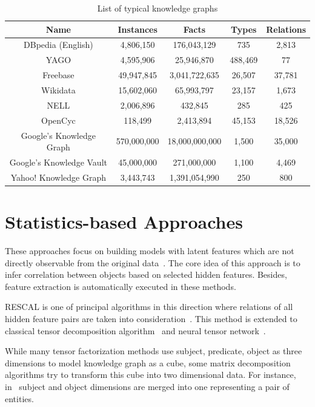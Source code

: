 \begin{table}
\begin{center}
\begin{tabular}{|c|c|c|c|c|}
\hline
Name & Instances & Facts & Types & Relations\\
\hline\hline
DBpedia (English) & 4,806,150 & 176,043,129 & 735 & 2,813\\
\hline
YAGO & 4,595,906 & 25,946,870 & 488,469 & 77\\
\hline
Freebase & 49,947,845 & 3,041,722,635 & 26,507 & 37,781\\
\hline
Wikidata & 15,602,060 & 65,993,797 & 23,157 & 1,673\\
\hline
NELL & 2,006,896 & 432,845 & 285 & 425\\
\hline
OpenCyc & 118,499 & 2,413,894 & 45,153 & 18,526\\
\hline
Google's Knowledge Graph & 570,000,000 & 18,000,000,000 & 1,500 & 35,000\\
\hline
Google's Knowledge Vault & 45,000,000 & 271,000,000 & 1,100 & 4,469\\
\hline
Yahoo! Knowledge Graph & 3,443,743 & 1,391,054,990 & 250 & 800\\
\hline
\end{tabular}
\end{center}
\caption{List of typical knowledge graphs}
\label{table1}
\end{table}

\section{Statistics-based Approaches}

These approaches focus on building models with latent features which are not directly observable from the original data~\cite{ref1}. The core idea of this approach is to infer correlation between objects based on selected hidden features. Besides, feature extraction is automatically executed in these methods.

RESCAL is one of principal algorithms in this direction where relations of all hidden feature pairs are taken into consideration~\cite{ref2, ref3}. This method is extended to classical tensor decomposition algorithm~\cite{ref4} and neural tensor network~\cite{ref5}.

While many tensor factorization methods use subject, predicate, object as three dimensions to model knowledge graph as a cube, some matrix decomposition algorithms try to transform this cube into two dimensional data. For instance, in~\cite{ref6, ref7} subject and object dimensions are merged into one representing a pair of entities.

